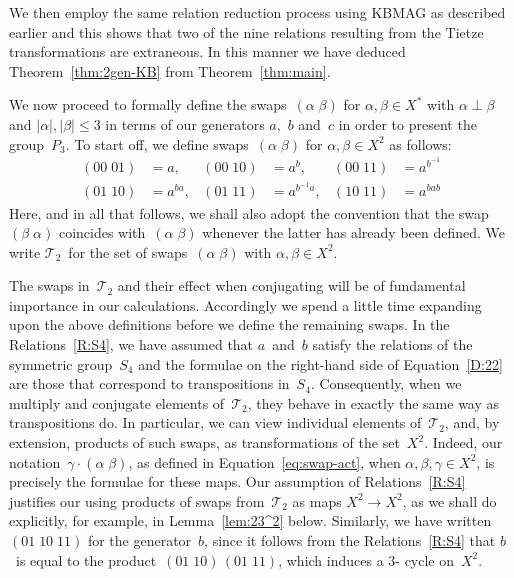 \documentclass[a4paper,11pt]{article}
\numberwithin{equation}{section}
\newcommand{\length}[1]{\mathopen{|}#1\mathclose{|}}
\newcommand{\nbd}{\nobreakdash-}
\newcommand{\spc}{\vspace{\baselineskip}}
\newcommand{\swap}[2]{(#1\;#2)}
\newcommand{\Sw}[1]{\mathcal{T}_{#1}}
\renewcommand{\leq}{\leqslant}
\begin{document}
We then employ the same relation reduction process using KBMAG as
described earlier and this shows that two of the nine relations
resulting from the Tietze transformations are extraneous.  In this
manner we have deduced Theorem~\ref{thm:2gen-KB} from
Theorem~\ref{thm:main}.

\spc

We now proceed to formally define the swaps~$\swap{\alpha}{\beta}$ for
$\alpha,\beta \in X^{\ast}$ with $\alpha \perp \beta$ and
$\length{\alpha},\length{\beta} \leq 3$ in terms of our generators
$a$,~$b$ and~$c$ in order to present the group~$P_{3}$.  To start off,
we define swaps~$\swap{\alpha}{\beta}$ for $\alpha,\beta \in X^{2}$ as
follows:
\begin{equation}
  \begin{aligned}
    \swap{00}{01} &= a,
    &\swap{00}{10} &= a^{b},
    &\swap{00}{11} &= a^{b^{-1}} \\
    \swap{01}{10} &= a^{ba},
    &\swap{01}{11} &= a^{b^{-1}a},
    &\swap{10}{11} &= a^{bab}
  \end{aligned}
  \label{D:22}
\end{equation}
Here, and in all that follows, we shall also adopt the convention that
the swap~$\swap{\beta}{\alpha}$ coincides with~$\swap{\alpha}{\beta}$
whenever the latter has already been defined.  We write $\Sw{2}$~for
the set of swaps~$\swap{\alpha}{\beta}$ with $\alpha,\beta \in X^{2}$.

The swaps in~$\Sw{2}$ and their effect when conjugating will be of
fundamental importance in our calculations.  Accordingly we spend a
little time expanding upon the above definitions before we define the
remaining swaps.  In the Relations~\ref{R:S4}, we have assumed that
$a$~and~$b$ satisfy the relations of the symmetric group~$S_{4}$ and
the formulae on the right-hand side of Equation~\eqref{D:22} are those
that correspond to transpositions in~$S_{4}$.  Consequently, when we
multiply and conjugate elements of~$\Sw{2}$, they behave in exactly
the same way as transpositions do.  In particular, we can view
individual elements of~$\Sw{2}$, and, by extension, products of such
swaps, as transformations of the set~$X^{2}$.  Indeed, our
notation~$\gamma \cdot \swap{\alpha}{\beta}$, as defined in
Equation~\eqref{eq:swap-act}, when $\alpha,\beta,\gamma \in X^{2}$, is
precisely the formulae for these maps.  Our assumption of
Relations~\ref{R:S4} justifies our using products of swaps
from~$\Sw{2}$ as maps $X^{2} \to X^{2}$, as we shall do explicitly,
for example, in Lemma~\ref{lem:23^2} below.  Similarly, we have
written $( 01 \; 10 \; 11 )$ for the generator~$b$,
since it follows from the Relations~\ref{R:S4} that $b$~is equal to
the product~$\swap{01}{10} \, \swap{01}{11}$, which induces a $3$\nbd
cycle on~$X^{2}$.
\end{document}
